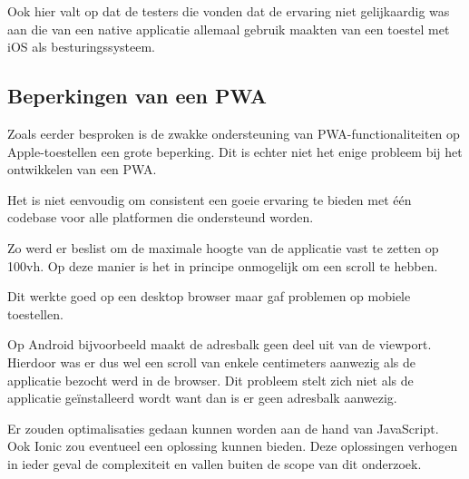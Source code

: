		Ook hier valt op dat de testers die vonden dat de ervaring niet gelijkaardig was aan die van een native applicatie allemaal gebruik maakten van een toestel met iOS als besturingssysteem.
		
	\subsection{Beperkingen van een PWA}
	
		Zoals eerder besproken is de zwakke ondersteuning van PWA-functionaliteiten op Apple-toestellen een grote beperking. Dit is echter niet het enige probleem bij het ontwikkelen van een PWA.
			
		Het is niet eenvoudig om consistent een goeie ervaring te bieden met één codebase voor alle platformen die ondersteund worden. 
		
		Zo werd er beslist om de maximale hoogte van de applicatie vast te zetten op 100vh. Op deze manier is het in principe onmogelijk om een scroll te hebben.
		
		Dit werkte goed op een desktop browser maar gaf problemen op mobiele toestellen.
		
		Op Android bijvoorbeeld maakt de adresbalk geen deel uit van de viewport. Hierdoor was er dus wel een scroll van enkele centimeters aanwezig als de applicatie bezocht werd in de browser. Dit probleem stelt zich niet als de applicatie geïnstalleerd wordt want dan is er geen adresbalk aanwezig.
		

		Er zouden optimalisaties gedaan kunnen worden aan de hand van JavaScript. Ook Ionic zou eventueel een oplossing kunnen bieden. Deze oplossingen verhogen in ieder geval de complexiteit en vallen buiten de scope van dit onderzoek.
	
	
	
	
			
		